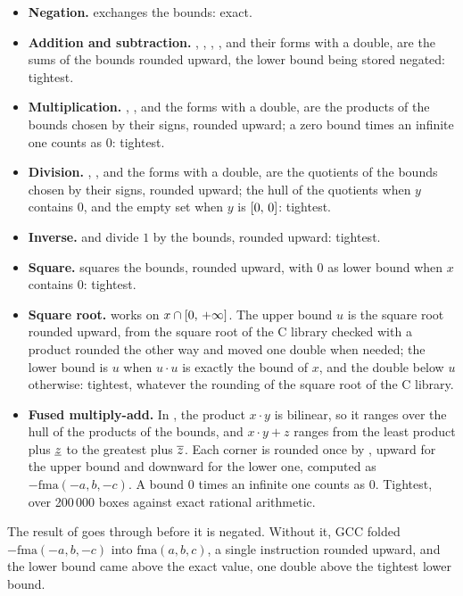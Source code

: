 \begin{itemize}
\item[$\bullet$] \textbf{Negation.}  exchanges the bounds: exact.
\item[$\bullet$] \textbf{Addition and subtraction.} ,
  , \code{+=}, \code{-=}, and their forms with a double, are the
  sums of the bounds rounded upward, the lower bound being stored negated:
  tightest.
\item[$\bullet$] \textbf{Multiplication.} , \code{*=}, and the
  forms with a double, are the products of the bounds chosen by their signs,
  rounded upward; a zero bound times an infinite one counts as $0$:
  tightest.
\item[$\bullet$] \textbf{Division.} , \code{/=}, and the forms
  with a double, are the quotients of the bounds chosen by their signs,
  rounded upward; the hull of the quotients when $y$ contains $0$, and the
  empty set when $y$ is $[0,\,0]$: tightest.
\item[$\bullet$] \textbf{Inverse.}  and 
  divide $1$ by the bounds, rounded upward: tightest.
\item[$\bullet$] \textbf{Square.}  squares the bounds, rounded
  upward, with $0$ as lower bound when $x$ contains $0$: tightest.
\item[$\bullet$] \textbf{Square root.}  works on
  $x\cap[0,\,+\infty]$. The upper bound $u$ is the square root rounded
  upward, from the square root of the C library checked with a product
  rounded the other way and moved one double when needed; the lower bound
  is $u$ when $u\cdot u$ is exactly the bound of $x$, and the double below
  $u$ otherwise: tightest, whatever the rounding of the square root of the
  C library.
\item[$\bullet$] \textbf{Fused multiply-add.} In , the
  product $x\cdot y$ is bilinear, so it ranges over the hull of the
  products of the bounds, and $x\cdot y+z$ ranges from the least product
  plus $\underline{z}$ to the greatest plus $\overline{z}$. Each corner
  is rounded once by , upward for the upper bound and
  downward for the lower one, computed as $-\mathrm{fma}(-a, b, -c)$. A
  bound $0$ times an infinite one counts as $0$.\newinvfive{} Tightest,
  over 200\,000 boxes against exact rational arithmetic.
\end{itemize}

\begin{Rem}
The result of  goes through  before it is
negated. Without it, GCC folded $-\mathrm{fma}(-a, b, -c)$ into
$\mathrm{fma}(a, b, c)$, a single instruction rounded upward, and the lower
bound came above the exact value, one double above the tightest lower bound.
\end{Rem}

